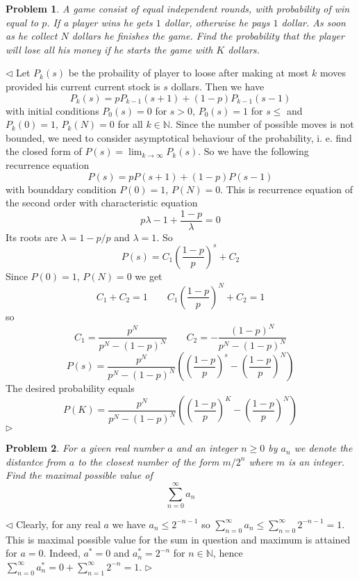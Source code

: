 \documentclass[12pt]{article}
\newtheorem{problem}{Problem}[subsection]
\newenvironment{solution}{\par $\triangleleft$}{$\triangleright$}
\begin{document}
\begin{problem} A game consist of equal independent rounds, with probability of win equal to $p$. If a player wins he gets $1$ dollar, otherwise he pays $1$ dollar. As soon as he collect $N$ dollars he finishes the game. Find the probability that the player will lose all his money if he starts the game with $K$ dollars. 
\end{problem}
\begin{solution} Let $P_k(s)$ be the probaility of player to loose after making at most $k$ moves provided his current current stock is $s$ dollars. Then we have
$$
P_k(s)=pP_{k-1}(s+1)+(1-p)P_{k-1}(s-1)
$$
with initial conditions $P_0(s)=0$ for $s>0$, $P_0(s)=1$ for $s\leq $ and $P_k(0)=1$, $P_k(N)=0$ for all $k\in\mathbb{N}$. Since the number of possible moves is not bounded, we need to consider asymptotical behaviour of the probability, i. e. find the closed form of $P(s)=\lim_{k\to\infty} P_k(s)$. So we have the following recurrence equation
$$
P(s)=pP(s+1)+(1-p)P(s-1)
$$
with bounddary condition $P(0)=1$, $P(N)=0$. This is recurrence equation of the second order with characteristic equation
$$
p\lambda-1+\frac{1-p}{\lambda}=0
$$
Its roots are $\lambda=1-p/p$ and $\lambda=1$. So 
$$
P(s)=C_1\left(\frac{1-p}{p}\right)^s+C_2
$$
Since $P(0)=1$, $P(N)=0$ we get 
$$
C_1+C_2=1\qquad C_1\left(\frac{1-p}{p}\right)^N+C_2=1
$$ 
so 
$$
C_1=\frac{p^N}{p^N-(1-p)^N}\qquad C_2=-\frac{(1-p)^N}{p^N-(1-p)^N}
$$
$$
P(s)=\frac{p^N}{p^N-(1-p)^N}\left(\left(\frac{1-p}{p}\right)^s-\left(\frac{1-p}{p}\right)^N\right)
$$
The desired  probability equals
$$
P(K)=\frac{p^N}{p^N-(1-p)^N}\left(\left(\frac{1-p}{p}\right)^K-\left(\frac{1-p}{p}\right)^N\right)
$$
\end{solution}
 
\begin{problem} For a given real number $a$ and an integer $n\geq 0$ by $a_n$ we denote the distantce from $a$ to the closest number of the form $m/2^n$ where $m$ is an integer. Find the maximal possible value of
$$
\sum_{n=0}^\infty a_n
$$
\end{problem}
\begin{solution} Clearly, for any real $a$ we have $a_n\leq 2^{-n-1}$ so $\sum_{n=0}^\infty a_n\leq \sum_{n=0}^\infty 2^{-n-1}=1$. This is maximal possible value for the sum in question and maximum is attained for $a=0$. Indeed, $a^*=0$ and $a_n^*=2^{-n}$ for $n\in\mathbb{N}$, hence $\sum_{n=0}^\infty a_n^*=0+\sum_{n=1}^\infty 2^{-n}=1$.
\end{solution} 
 
\end{document}
